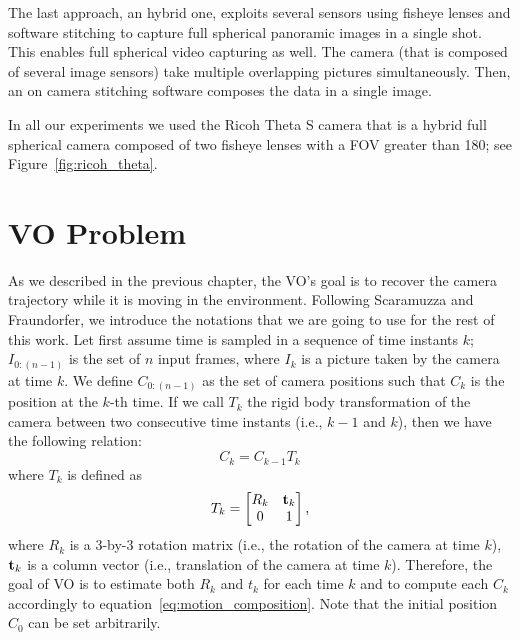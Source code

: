 The last approach, an hybrid one, exploits several sensors using fisheye lenses and software stitching to capture full spherical panoramic images in a single shot. This enables full spherical video capturing as well. The camera (that is composed of several image sensors) take multiple overlapping pictures simultaneously. Then, an on camera stitching software composes the data in a single image.

In all our experiments we used the Ricoh Theta S camera that is a hybrid full spherical camera composed of two fisheye lenses with a FOV greater than 180\degree; see Figure~\ref{fig:ricoh_theta}.
%
%

\section{VO Problem}
\label{sec:vo_problem}
As we described in the previous chapter, the VO's goal is to recover the 
camera trajectory while it is moving in the environment. Following Scaramuzza and Fraundorfer\cite{scaramuzzaVisualOdometryI},
we introduce the notations that we are going to use for the rest of this work.
%
Let first assume time is sampled in a sequence of time instants \(k\); 
\(I_{0:(n - 1)} \) is the set of $n$ input frames, where \(I_{k}\) is a picture taken by 
the camera at time \(k\). We define \(C_{0:(n-1)}\) as the set of camera 
positions such that \(C_k\) is the position at the \(k\)-th time.
If we call \(T_k\) the rigid body transformation of the camera between two
consecutive time instants (i.e., $k-1$ and $k$), then we have the following relation:
%
\begin{equation}
	C_k = C_{k-1} T_k
	\label{eq:motion_composition}
\end{equation}
%
\noindent where \(T_k\) is defined as
%
\begin{equation*}
	T_k =
	\begin{bmatrix}
	R_k & \mathbf{t}_k \\
	0 & 1
	\end{bmatrix} \text{,}
\end{equation*}
%
\noindent where $R_k$ is a 3-by-3 rotation matrix (i.e., the rotation of the camera at time $k$),
$\mathbf{t}_k$ is a column vector (i.e., translation of the camera at time $k$).
Therefore, the goal of VO is to estimate both $R_k$ and $t_k$ for each time 
$k$ and to compute each $C_k$ accordingly to equation~\ref{eq:motion_composition}. Note that the initial position $C_0$ can be set arbitrarily.

